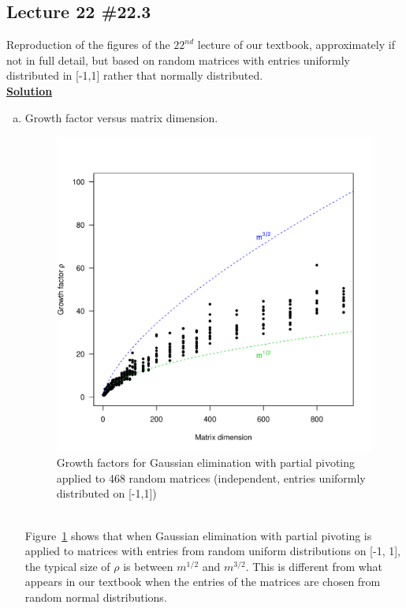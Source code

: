 \documentclass[11pt]{article}
\begin{document}
\subsection*{Lecture 22 \#22.3}
Reproduction of the figures of the $22^{nd}$ lecture of our textbook, approximately if not in full detail,  but based on random matrices with entries uniformly distributed in [-1,1] rather that normally distributed.\\
\underline{\textbf{Solution}}\\
\begin{enumerate}[(a)]
\pagebreak
\item Growth factor versus matrix dimension.
\begin{figure}[htbp]
  \begin{center}
  \includegraphics[scale =.8]{growth_factor.pdf}
  \caption{Growth factors for Gaussian elimination with partial pivoting applied to 468 random matrices (independent, entries uniformly distributed on [-1,1])} \label{fig:22.1} 
  \end{center}
\end{figure}\\
Figure~\ref{fig:22.1} shows that when Gaussian elimination with partial pivoting is applied to matrices  with entries from random uniform distributions on [-1, 1], the typical size of $\rho$ is between $m^{1/2}$ and $m^{3/2}$. This is different from what appears in our textbook when the entries of the matrices are chosen from random normal distributions.


\end{enumerate}
\end{document}
